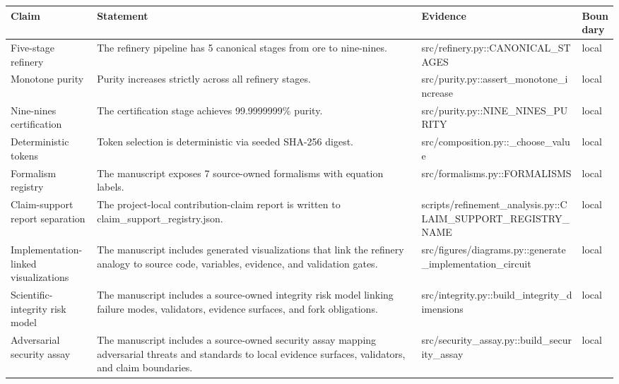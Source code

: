 \documentclass[
]{article}
\newcounter{none} %
\begin{document}
{\def\LTcaptype{none} %
\begin{longtable}[]{@{}
  >{\raggedright\arraybackslash}p{}
  >{\raggedright\arraybackslash}p{}
  >{\raggedright\arraybackslash}p{}
  >{\raggedright\arraybackslash}p{}@{}}
\toprule\noalign{}
\begin{minipage}[b]{\linewidth}\raggedright
Claim
\end{minipage} & \begin{minipage}[b]{\linewidth}\raggedright
Statement
\end{minipage} & \begin{minipage}[b]{\linewidth}\raggedright
Evidence
\end{minipage} & \begin{minipage}[b]{\linewidth}\raggedright
Boundary
\end{minipage} \\
\midrule\noalign{}
\endhead
\bottomrule\noalign{}
\endlastfoot
Five-stage refinery & The refinery pipeline has 5 canonical stages from
ore to nine-nines. & src/refinery.py::CANONICAL\_STAGES & local \\
Monotone purity & Purity increases strictly across all refinery stages.
& src/purity.py::assert\_monotone\_increase & local \\
Nine-nines certification & The certification stage achieves 99.9999999\%
purity. & src/purity.py::NINE\_NINES\_PURITY & local \\
Deterministic tokens & Token selection is deterministic via seeded
SHA-256 digest. & src/composition.py::\_choose\_value & local \\
Formalism registry & The manuscript exposes 7 source-owned formalisms
with equation labels. & src/formalisms.py::FORMALISMS & local \\
Claim-support report separation & The project-local contribution-claim
report is written to claim\_support\_registry.json. &
scripts/refinement\_analysis.py::CLAIM\_SUPPORT\_REGISTRY\_NAME &
local \\
Implementation-linked visualizations & The manuscript includes generated
visualizations that link the refinery analogy to source code, variables,
evidence, and validation gates. &
src/figures/diagrams.py::generate\_implementation\_circuit & local \\
Scientific-integrity risk model & The manuscript includes a source-owned
integrity risk model linking failure modes, validators, evidence
surfaces, and fork obligations. &
src/integrity.py::build\_integrity\_dimensions & local \\
Adversarial security assay & The manuscript includes a source-owned
security assay mapping adversarial threats and standards to local
evidence surfaces, validators, and claim boundaries. &
src/security\_assay.py::build\_security\_assay & local \\
\end{longtable}
}
\end{document}

